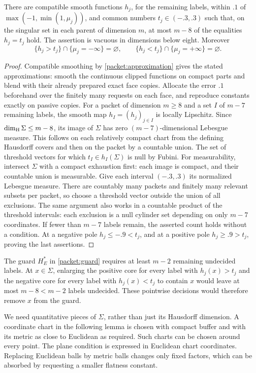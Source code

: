\begin{lemma}\label{local:anchors}
There are compatible smooth functions $h_j$, for the remaining labels,
within $.1$ of $\max(-1,\min(1,\mu_j))$, and common numbers
$t_j\in(-.3,.3)$ such that, on the singular set in each parent of
dimension $m$, at most $m-8$ of the equalities $h_j=t_j$ hold.
The assertion is vacuous in dimensions below eight.  Moreover
\[
 \{h_j>t_j\}\cap\{\mu_j=-\infty\}=\varnothing,
 \qquad
 \{h_j<t_j\}\cap\{\mu_j=+\infty\}=\varnothing.
\]
\end{lemma}
\begin{proof}
Compatible smoothing by \cref{packet:approximation} gives the stated
approximations: smooth the continuous clipped functions on compact
parts and blend with their already prepared exact face copies.
Allocate the error $.1$ beforehand over the finitely many requests
on each face, and reproduce constants exactly on passive copies.
For a packet of dimension $m\ge8$ and a set $I$ of $m-7$
remaining labels, the smooth map $h_I=(h_j)_{j\in I}$ is locally
Lipschitz.  Since $\dim_{\rm H}\Sigma\le m-8$, its image of $\Sigma$
has zero $(m-7)$-dimensional Lebesgue measure.  This follows on each
relatively compact chart from the defining Hausdorff covers and then
on the packet by a countable union.  The set of threshold vectors for
which $t_I\in h_I(\Sigma)$ is null by Fubini.  For measurability,
intersect $\Sigma$ with a compact exhaustion first: each image is compact,
and their countable union is measurable.  Give each interval $(-.3,.3)$
its normalized Lebesgue measure.  There are countably many packets and
finitely many relevant subsets per packet, so choose a threshold vector
outside the union of all exclusions.  The same argument also works in
a countable product of the threshold intervals: each exclusion is a
null cylinder set depending on only $m-7$ coordinates.  If fewer
than $m-7$ labels remain, the asserted count holds without a condition.
At a negative pole $h_j\le-.9<t_j$, and at a positive pole
$h_j\ge.9>t_j$, proving the last assertions.
\end{proof}

The guard $H_E^*$ in \eqref{packet:guard} requires at least $m-2$
remaining undecided labels.  At $x\in\Sigma$, enlarging the positive
core for every label with $h_j(x)>t_j$ and the negative core for every
label with $h_j(x)<t_j$ to contain $x$ would leave at most
$m-8<m-2$ labels undecided.  These pointwise decisions would therefore
remove $x$ from the guard.

We need quantitative pieces of $\Sigma$, rather than just its
Hausdorff dimension.  A coordinate chart in the following lemma is
chosen with compact buffer and with its metric as close to Euclidean
as required.  Such charts can be chosen around every point.  The plane
condition is expressed in Euclidean chart coordinates.  Replacing
Euclidean balls by metric balls changes only fixed factors, which can
be absorbed by requesting a smaller flatness constant.

